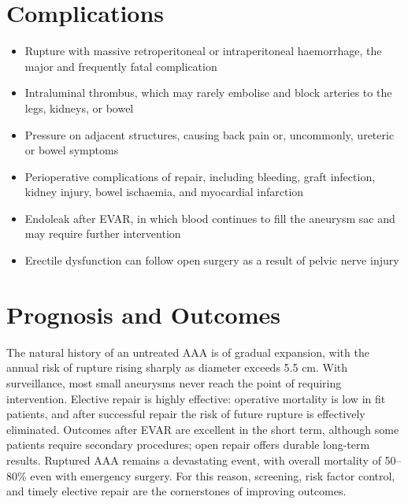 \section*{Complications}
\begin{itemize}
    \item Rupture with massive retroperitoneal or intraperitoneal haemorrhage, the major and frequently fatal complication
    \item Intraluminal thrombus, which may rarely embolise and block arteries to the legs, kidneys, or bowel
    \item Pressure on adjacent structures, causing back pain or, uncommonly, ureteric or bowel symptoms
    \item Perioperative complications of repair, including bleeding, graft infection, kidney injury, bowel ischaemia, and myocardial infarction
    \item Endoleak after EVAR, in which blood continues to fill the aneurysm sac and may require further intervention
    \item Erectile dysfunction can follow open surgery as a result of pelvic nerve injury
\end{itemize}

\section*{Prognosis and Outcomes}
The natural history of an untreated AAA is of gradual expansion, with the annual risk of rupture rising sharply as diameter exceeds 5.5 cm. With surveillance, most small aneurysms never reach the point of requiring intervention. Elective repair is highly effective: operative mortality is low in fit patients, and after successful repair the risk of future rupture is effectively eliminated. Outcomes after EVAR are excellent in the short term, although some patients require secondary procedures; open repair offers durable long-term results. Ruptured AAA remains a devastating event, with overall mortality of 50--80\% even with emergency surgery. For this reason, screening, risk factor control, and timely elective repair are the cornerstones of improving outcomes.

